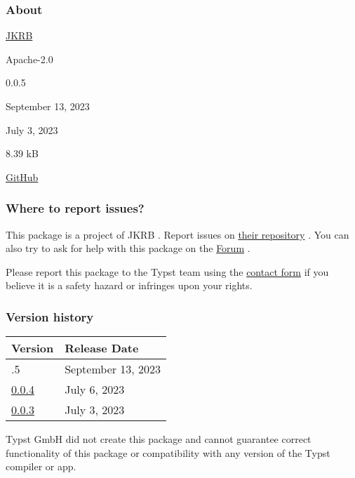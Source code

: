 \subsubsection{About}\label{about}

\begin{description}
\tightlist
\item[Author :]
\href{https://github.com/RolfBremer}{JKRB}
\item[License:]
Apache-2.0
\item[Current version:]
0.0.5
\item[Last updated:]
September 13, 2023
\item[First released:]
July 3, 2023
\item[Archive size:]
8.39 kB
\href{https://packages.typst.org/preview/gloss-awe-0.0.5.tar.gz}{\pandocbounded{}}
\item[Repository:]
\href{https://github.com/RolfBremer/gloss-awe}{GitHub}
\end{description}

\subsubsection{Where to report issues?}\label{where-to-report-issues}

This package is a project of JKRB . Report issues on
\href{https://github.com/RolfBremer/gloss-awe}{their repository} . You
can also try to ask for help with this package on the
\href{https://forum.typst.app}{Forum} .

Please report this package to the Typst team using the
\href{https://typst.app/contact}{contact form} if you believe it is a
safety hazard or infringes upon your rights.

\label{versions}
\subsubsection{Version history}\label{version-history}

\begin{longtable}[]{@{}ll@{}}
\toprule\noalign{}
Version & Release Date \\
\midrule\noalign{}
\endhead
\bottomrule\noalign{}
\endlastfoot
0.0.5 & September 13, 2023 \\
\href{https://typst.app/universe/package/gloss-awe/0.0.4/}{0.0.4} & July
6, 2023 \\
\href{https://typst.app/universe/package/gloss-awe/0.0.3/}{0.0.3} & July
3, 2023 \\
\end{longtable}

Typst GmbH did not create this package and cannot guarantee correct
functionality of this package or compatibility with any version of the
Typst compiler or app.
